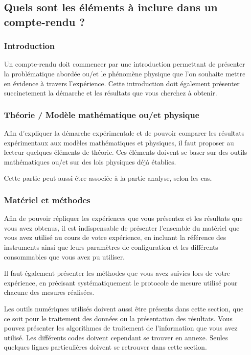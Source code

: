 \documentclass[11pt]{article} %
\begin{document}
\subsection{Quels sont les éléments à inclure dans un compte-rendu ?}\subsubsection{Introduction}

Un compte-rendu doit commencer par une introduction permettant de présenter la problématique abordée ou/et le phénomène physique que l'on souhaite mettre en évidence à travers l'expérience. Cette introduction doit également présenter succinctement la démarche et les résultats que vous cherchez à obtenir.

\subsubsection{Théorie / Modèle mathématique ou/et physique}
Afin d'expliquer la démarche expérimentale et de pouvoir comparer les résultats expérimentaux aux modèles mathématiques et physiques, il faut proposer au lecteur quelques éléments de théorie. Ces éléments doivent se baser sur des outils mathématiques ou/et sur des lois physiques déjà établies.

Cette partie peut aussi être associée à la partie analyse, selon les cas.

\subsubsection{Matériel et méthodes}
Afin de pouvoir répliquer les expériences que vous présentez et les résultats que vous avez obtenus, il est indispensable de présenter l'ensemble du matériel que vous avez utilisé au cours de votre expérience, en incluant la référence des instruments ainsi que leurs paramètres de configuration et les différents consommables que vous avez pu utiliser.

Il faut également présenter les méthodes que vous avez suivies lors de votre expérience, en précisant systématiquement le protocole de mesure utilisé pour chacune des mesures réalisées.

Les outils numériques utilisés doivent aussi être présents dans cette section, que ce soit pour le traitement des données ou la présentation des résultats. Vous pouvez présenter les algorithmes de
traitement de l'information que vous avez utilisé. Les différents codes doivent cependant se trouver en annexe. Seules quelques lignes particulières doivent se retrouver dans cette section.
\end{document}
